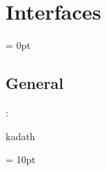 
\section{Interfaces} 


\parskip = 0pt

\vspace{3mm} \subsection*{General}

: 

kadath
\vspace{2mm}

\vspace{5mm}\parskip = 10pt 

